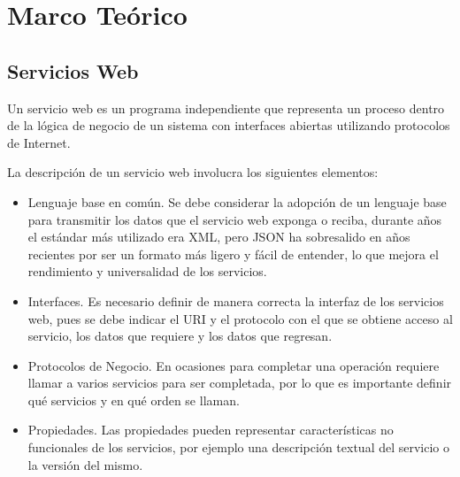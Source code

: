 \chapter{ Marco Teórico }

\section{ Servicios Web }
Un servicio web es un programa independiente que representa un proceso dentro de la lógica de negocio de un sistema con interfaces abiertas utilizando protocolos de Internet.

La descripción de un servicio web involucra los siguientes elementos:

\begin{itemize}
\item Lenguaje base en común. Se debe considerar la adopción de un lenguaje base para transmitir los datos que el servicio web exponga o reciba, durante años el estándar más utilizado era XML, pero JSON ha sobresalido en años recientes por ser un formato más ligero y fácil de entender, lo que mejora el rendimiento y universalidad de los servicios.
\item  Interfaces. Es necesario definir de manera correcta la interfaz de los servicios web, pues se debe indicar el URI y el protocolo con el que se obtiene acceso al servicio, los datos que requiere y los datos que regresan.
\item Protocolos de Negocio. En ocasiones para completar una operación requiere llamar a varios servicios para ser completada, por lo que es importante definir qué servicios y en qué orden se llaman.
\item Propiedades. Las propiedades pueden representar características no funcionales de los servicios, por ejemplo una descripción textual del servicio o la versión del mismo.
\end{itemize}



 

